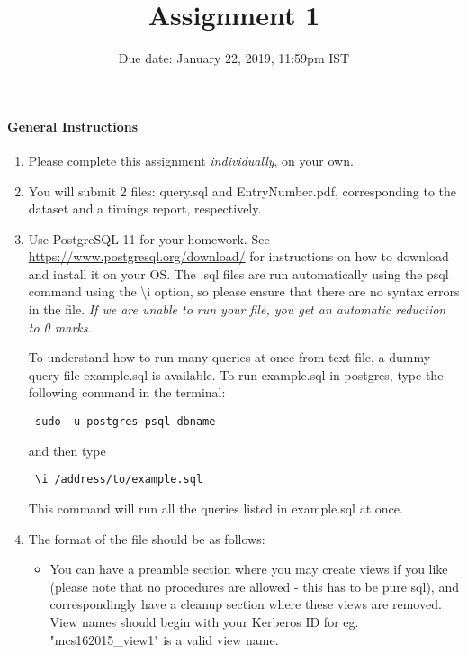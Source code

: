 \documentclass[10pt]{article}
\title{Assignment 1}
\date{Due date: January 22, 2019, 11:59pm IST}
\begin{document}
\maketitle
\paragraph*{General Instructions}


\begin{enumerate}

\item Please complete this assignment \emph{individually}, on your own.

\item You will submit 2 files: query.sql and EntryNumber.pdf, corresponding to the dataset and a timings report, respectively.

\item Use PostgreSQL 11 for your homework. See \url{https://www.postgresql.org/download/} for instructions
on how to download and install it on your OS. The .sql files are run automatically using the psql command using the \textbackslash i option, so please ensure that there are no syntax errors in the file. {\it If we are unable to run your file, you get an automatic reduction to 0 marks.}


To understand how to run many queries at once from text file, a dummy query file example.sql is available. To run example.sql in postgres, type the following command in the terminal:

\begin{verbatim} sudo -u postgres psql dbname \end{verbatim}

    and then type

\begin{verbatim} \i /address/to/example.sql \end{verbatim}

This command will run all the queries listed in example.sql at once.

\item The format of the file should be as follows:

\begin{itemize}
    \item You can have a preamble section where you may create views if you like (please note that no procedures are allowed - this has to be pure sql), and correspondingly have a cleanup section where these views are removed. View names should begin with your Kerberos ID for eg. "mcs162015\_view1" is a valid view name.


\end{itemize}
\end{enumerate}
\end{document}

